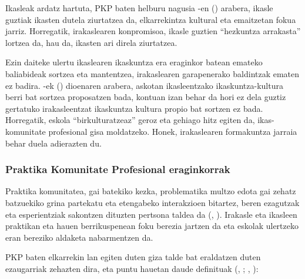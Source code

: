Ikasleak ardatz hartuta, PKP baten helburu nagusia \citeauthor{dufour2004whatever}-en (\citeyear{dufour2004whatever}) arabera, ikasle guztiak ikasten dutela ziurtatzea da, elkarrekintza kultural eta emaitzetan fokua jarriz. Horregatik, irakaslearen konpromisoa, ikasle guztien “hezkuntza arrakasta” lortzea da, hau da, ikasten ari direla ziurtatzea.

Ezin daiteke ulertu ikaslearen ikaskuntza era eraginkor batean emateko baliabideak sortzea eta mantentzea, irakaslearen garapenerako baldintzak ematen ez badira. \citeauthor{bolivar2012melhorar}-ek (\citeyear{bolivar2012melhorar}) dioenaren arabera, askotan ikasleentzako ikaskuntza-kultura berri bat sortzea proposatzen bada, kontuan izan behar da hori ez dela guztiz gertatuko irakasleentzat ikaskuntza kultura propio bat sortzen ez bada. Horregatik, eskola “birkulturatzeaz” geroz eta gehiago hitz egiten da, ikas-komunitate profesional gisa moldatzeko. Honek, irakaslearen formakuntza jarraia behar duela adierazten du.

\subsubsection{Praktika Komunitate Profesional eraginkorrak}\label{subsubsec:pkpe}

Praktika komunitatea, gai batekiko kezka, problematika multzo edota gai zehatz batzuekiko grina partekatu eta etengabeko interakzioen bitartez, beren ezagutzak eta esperientziak sakontzen dituzten pertsona taldea da (\citeauthor{wenger2002cultivating}, \citeyear{wenger2002cultivating}). Irakasle eta ikasleen praktikan eta hauen berrikuspenean foku berezia jartzen da eta eskolak ulertzeko eran bereziko aldaketa nabarmentzen da. 

PKP baten elkarrekin lan egiten duten giza talde bat eraldatzen duten ezaugarriak zehazten dira, eta puntu hauetan daude definituak (\citeauthor{louis1995professionalism}, \citeyear{louis1995professionalism}; \citeauthor{stoll2007professional}, \citeyear{stoll2007professional}):

